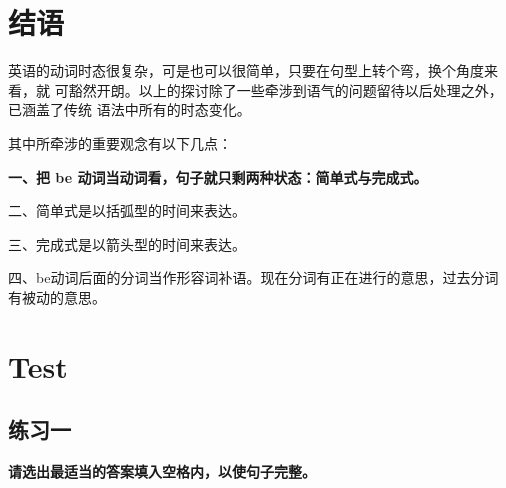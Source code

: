 \section{结语}

英语的动词时态很复杂，可是也可以很简单，只要在句型上转个弯，换个角度来看，就
可豁然开朗。以上的探讨除了一些牵涉到语气的问题留待以后处理之外，已涵盖了传统
语法中所有的时态变化。

其中所牵涉的重要观念有以下几点：

{\bfseries 一、把 be 动词当动词看，句子就只剩两种状态：简单式与完成式。

  二、简单式是以括弧型的时间来表达。

  三、完成式是以箭头型的时间来表达。

  四、be动词后面的分词当作形容词补语。现在分词有正在进行的意思，过去分词有被动的意思。}


\section{Test}

\subsection{练习一}

\textbf{请选出最适当的答案填入空格内，以使句子完整。}

